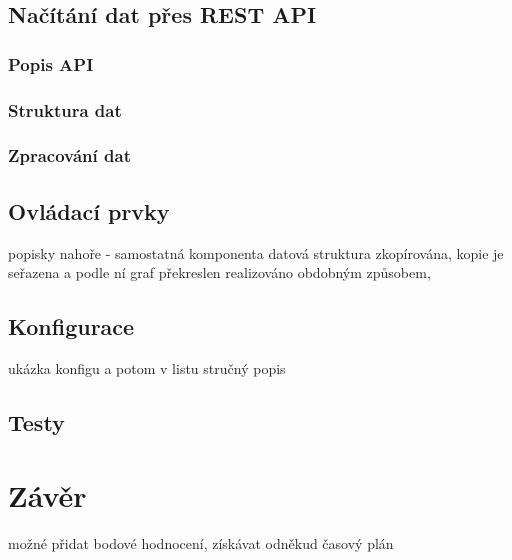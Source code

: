 \documentclass[
  digital, %
  oneside, %
  table,   %
  nolof,     %
  nolot,     %
]{fithesis3}
\begin{document}
\section{Načítání dat přes REST API}
\subsection{Popis API}
\subsection{Struktura dat}
\subsection{Zpracování dat}

\section{Ovládací prvky}
popisky nahoře - samostatná komponenta
datová struktura zkopírována, kopie je seřazena a podle ní graf překreslen
realizováno obdobným způsobem, 

\section{Konfigurace}
ukázka konfigu a potom v listu stručný popis

\section{Testy}

\chapter{Závěr}
možné přidat bodové hodnocení, získávat odněkud časový plán

\printbibliography
\end{document}
